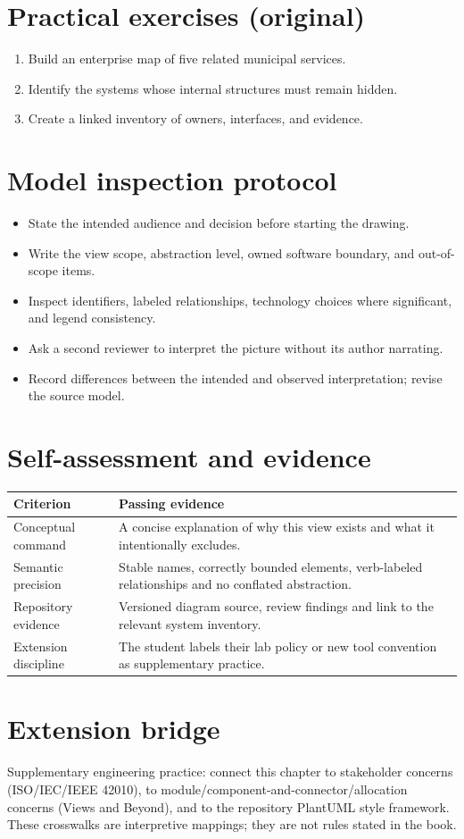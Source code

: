 \documentclass[10pt,letterpaper]{article}
\begin{document}
\section{Practical exercises (original)}
\begin{enumerate}
\item Build an enterprise map of five related municipal services.
\item Identify the systems whose internal structures must remain hidden.
\item Create a linked inventory of owners, interfaces, and evidence.
\end{enumerate}

\section{Model inspection protocol}
\begin{itemize}
\item State the intended audience and decision before starting the drawing.
\item Write the view scope, abstraction level, owned software boundary, and out-of-scope items.
\item Inspect identifiers, labeled relationships, technology choices where significant, and legend consistency.
\item Ask a second reviewer to interpret the picture without its author narrating.
\item Record differences between the intended and observed interpretation; revise the source model.
\end{itemize}

\section{Self-assessment and evidence}
\begin{tabularx}{\linewidth}{@{}YY@{}}\toprule
\textbf{Criterion} & \textbf{Passing evidence} \\ \midrule
Conceptual command & A concise explanation of why this view exists and what it intentionally excludes. \\
Semantic precision & Stable names, correctly bounded elements, verb-labeled relationships and no conflated abstraction. \\
Repository evidence & Versioned diagram source, review findings and link to the relevant system inventory. \\
Extension discipline & The student labels their lab policy or new tool convention as supplementary practice. \\
\bottomrule\end{tabularx}


\section{Extension bridge}
Supplementary engineering practice: connect this chapter to stakeholder concerns (ISO/IEC/IEEE 42010), to module/component-and-connector/allocation concerns (Views and Beyond), and to the repository PlantUML style framework. These crosswalks are interpretive mappings; they are not rules stated in the book.
\end{document}
